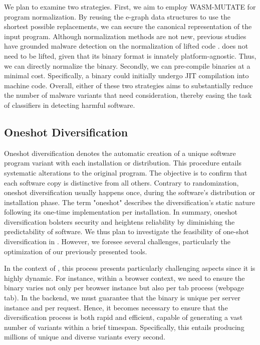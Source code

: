 We plan to examine two strategies. 
First, we aim to employ WASM-MUTATE for program normalization. 
By reusing the e-graph data structures to use the shortest possible replacements, we can secure the canonical representation of the input program. 
Although normalization methods are not new, previous studies have grounded malware detection on the normalization of lifted code \cite{ 6234404, 10.1007/978-3-030-78120-0_5}. 
\Wasm does not need to be lifted, given that its binary format is innately platform-agnostic. 
Thus, we can directly normalize the \Wasm binary.
Secondly, we can pre-compile \Wasm binaries at a minimal cost. 
Specifically, a \Wasm binary could initially undergo JIT compilation into machine code. 
Overall, either of these two strategies aims to substantially reduce the number of malware variants that need consideration, thereby easing the task of classifiers in detecting harmful software. 



\vspace{-0.3cm}
\subsection{Oneshot Diversification}
Oneshot diversification denotes the automatic creation of a unique software program variant with each installation or distribution. 
This procedure entails systematic alterations to the original program. 
The objective is to confirm that each software copy is distinctive from all others. 
Contrary to randomization, oneshot diversification usually happens once, during the software's distribution or installation phase. 
The term "oneshot" describes the diversification's static nature following its one-time implementation per installation. 
In summary, oneshot diversification bolsters security and heightens reliability by diminishing the predictability of software.
We thus plan to investigate the feasibility of one-shot diversification in \Wasm. 
However, we foresee several challenges, particularly the optimization of our previously presented tools.


In the context of \Wasm, this process presents particularly challenging aspects since it is highly dynamic.
For instance, within a browser context, we need to ensure the \Wasm binary varies not only per browser instance but also per tab process (webpage tab).
In the backend, we must guarantee that the \Wasm binary is unique per server instance and per request.
Hence, it becomes necessary to ensure that the diversification process is both rapid and efficient, capable of generating a vast number of variants within a brief timespan.
Specifically, this entails producing millions of unique and diverse variants every second.



